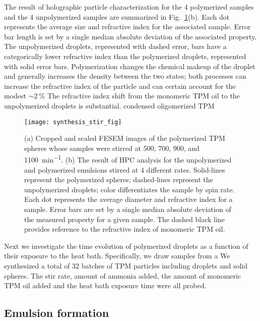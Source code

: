 The result of holographic particle characterization for the \num{4} polymerized samples
and the \num{4} unpolymerized samples are summarized in Fig.~\ref{fig:synthesis_stir_rate}(b).
Each dot represents the average size and refractive index for the associated sample. Error
bar length is set by a single median absolute deviation of the associated property.
The unpolymerized droplets, represented with dashed error, bars have a categorically
lower refractive index than the polymerized droplets, represented with solid error bars.
Polymerization changes the chemical makeup of the droplet and generally increases the
density between the two states; both processes can increase the refractive index
of the particle and can certain account for the modest $\sim\SI{2}{\percent}$ %
The refractive index shift from the monomeric TPM oil to the unpolymerized droplets
is substantial.
condensed oligomerized TPM


\begin{figure}
    \centering
    \texttt{[image: synthesis\_stir\_fig]}
    \caption{(a) Cropped and scaled FESEM images of the polymerized TPM spheres whose
      samples were stirred at \num{500}, \num{700}, \num{900}, and \SI{1100}{\minute^{-1}}.
      (b)  The result of HPC analysis for the unpolymerized and polymerized
      emulsions stirred at \num{4} different rates. Solid-lines represent the polymerized
      spheres; dashed-lines represent the unpolymerized droplets; color differentiates the sample by
      spin rate. Each dot represents the
      average diameter and refractive index for a sample. Error bars are set by a single
      median absolute deviation of the measured property for a given sample. The dashed
      black line provides reference to the refractive index of monomeric TPM oil.}
    \label{fig:synthesis_stir_rate}
\end{figure}

Next we investigate the time evolution of
polymerized droplets as a function of their exposure to the heat bath. Specifically, we draw
samples from a 
We synthesized a total of \num{32} batches of TPM particles including droplets and solid
spheres. The stir rate, amount of ammonia added, the amount of monomeric TPM oil added
and the heat bath exposure time were all probed.

\subsection{Emulsion formation}

